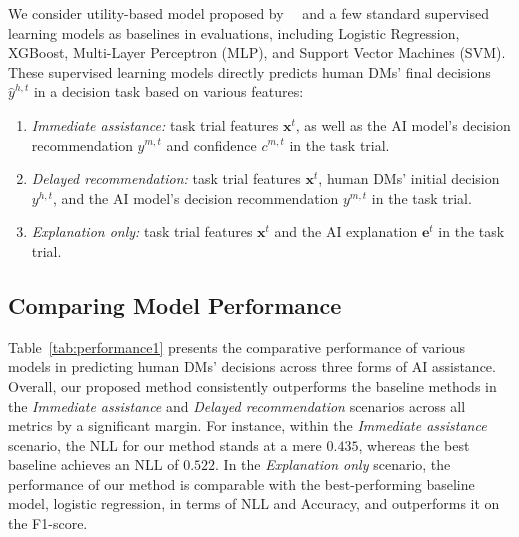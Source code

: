 \documentclass[letterpaper]{article} %
\begin{document}
We consider utility-based  model proposed by~\citeauthor{wang2022will}~ and  a few standard supervised learning models as baselines in evaluations, including Logistic Regression, XGBoost, Multi-Layer Perceptron (MLP), and Support Vector Machines (SVM). These supervised learning models directly predicts human DMs' final decisions $\hat{y}^{h,t}$ in a decision task based on various features:
\begin{enumerate}
    \item \emph{Immediate assistance:} task trial features $\bm{x}^t$, as well as the AI model's decision recommendation $y^{m,t}$ and confidence $c^{m,t}$ in the task trial.
    \item  \emph{Delayed recommendation:} task trial features $\bm{x}^t$, human DMs' initial decision $y^{h,t}$, 
    and the AI model's decision recommendation $y^{m,t}$ in the task trial.

    \item \emph{Explanation only:} task trial features $\bm{x}^t$ and the AI explanation $\bm{e}^t$ in the task trial.
\end{enumerate}



\subsection{Comparing Model Performance}
Table~\ref{tab:performance1} presents the comparative performance of various models in predicting human DMs' decisions across three forms of AI assistance. Overall, our proposed method consistently outperforms the baseline methods in the \emph{Immediate assistance} and \emph{Delayed recommendation} scenarios across all metrics by a significant margin. For instance, within the \emph{Immediate assistance} scenario, the NLL for our method stands at a mere $0.435$, whereas the best baseline achieves an NLL of $0.522$. In the \emph{Explanation only} scenario, the performance of our method is comparable with the best-performing baseline model, logistic regression, in terms of NLL and Accuracy, and outperforms it on the F1-score. 
\end{document}

